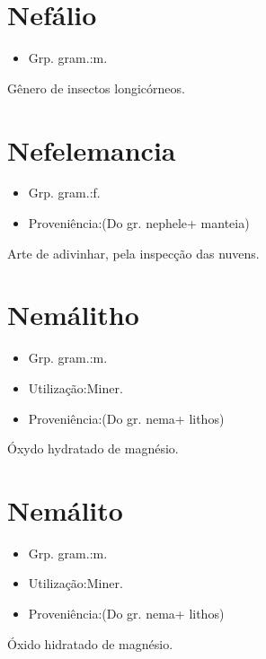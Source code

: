 \section{Nefálio}
\begin{itemize}
\item {Grp. gram.:m.}
\end{itemize}
Gênero de insectos longicórneos.
\section{Nefelemancia}
\begin{itemize}
\item {Grp. gram.:f.}
\end{itemize}
\begin{itemize}
\item {Proveniência:(Do gr. \textunderscore nephele\textunderscore  + \textunderscore manteia\textunderscore )}
\end{itemize}
Arte de adivinhar, pela inspecção das nuvens.
\section{Nemálitho}
\begin{itemize}
\item {Grp. gram.:m.}
\end{itemize}
\begin{itemize}
\item {Utilização:Miner.}
\end{itemize}
\begin{itemize}
\item {Proveniência:(Do gr. \textunderscore nema\textunderscore  + \textunderscore lithos\textunderscore )}
\end{itemize}
Óxydo hydratado de magnésio.
\section{Nemálito}
\begin{itemize}
\item {Grp. gram.:m.}
\end{itemize}
\begin{itemize}
\item {Utilização:Miner.}
\end{itemize}
\begin{itemize}
\item {Proveniência:(Do gr. \textunderscore nema\textunderscore  + \textunderscore lithos\textunderscore )}
\end{itemize}
Óxido hidratado de magnésio.
